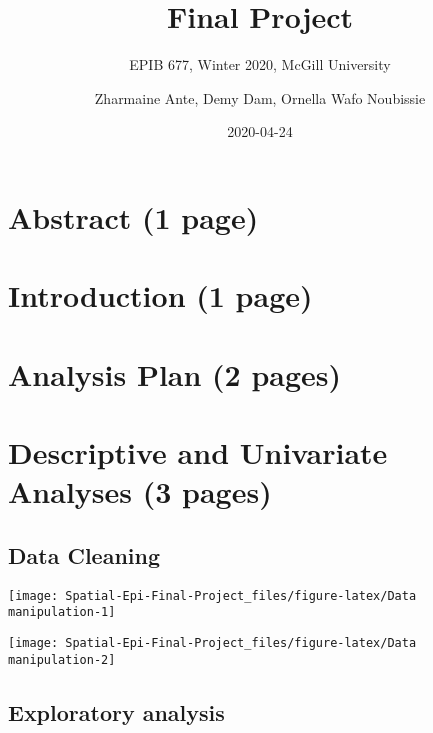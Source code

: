 \documentclass[]{article}
\title{Final Project}
\subtitle{EPIB 677, Winter 2020, McGill University}
\author{Zharmaine Ante, Demy Dam, Ornella Wafo Noubissie}
\date{2020-04-24}
\begin{document}
\maketitle

\hypertarget{abstract-1-page}{%
\section{Abstract (1 page)}\label{abstract-1-page}}

\hypertarget{introduction-1-page}{%
\section{Introduction (1 page)}\label{introduction-1-page}}

\hypertarget{analysis-plan-2-pages}{%
\section{Analysis Plan (2 pages)}\label{analysis-plan-2-pages}}

\hypertarget{descriptive-and-univariate-analyses-3-pages}{%
\section{Descriptive and Univariate Analyses (3
pages)}\label{descriptive-and-univariate-analyses-3-pages}}

\hypertarget{data-cleaning}{%
\subsection{Data Cleaning}\label{data-cleaning}}

\begin{center}\texttt{[image: Spatial-Epi-Final-Project\_files/figure-latex/Data manipulation-1]} \end{center}

\begin{center}\texttt{[image: Spatial-Epi-Final-Project\_files/figure-latex/Data manipulation-2]} \end{center}

\hypertarget{exploratory-analysis}{%
\subsection{Exploratory analysis}\label{exploratory-analysis}}
\end{document}
